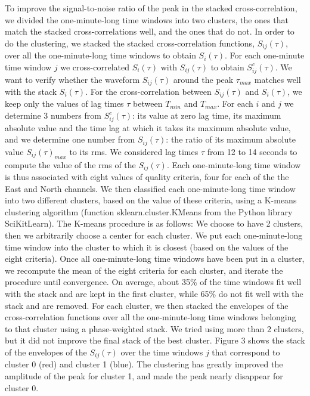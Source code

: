 \documentclass[draft]{agujournal2019}
\begin{document}
To improve the signal-to-noise ratio of the peak in the stacked cross-correlation, we divided the one-minute-long time windows into two clusters, the ones that match the stacked cross-correlations well, and the ones that do not. In order to do the clustering, we stacked the stacked cross-correlation functions, $S_{i j} (\tau)$, over all the one-minute-long time windows to obtain $S_i (\tau)$. For each one-minute time window $j$ we cross-correlated $S_i (\tau)$ with $S_{i j} (\tau)$ to obtain $S^c_{i j} (\tau)$. We want to verify whether the waveform $S_{i j} (\tau)$ around the peak $\tau_{max}$ matches well with the stack $S_i (\tau)$. For the cross-correlation between $S_{i j} (\tau)$ and $S_i (\tau)$, we keep only the values of lag times $\tau$ between $T_{min}$ and $T_{max}$. For each $i$ and $j$ we determine 3 numbers from $S^c_{i j} (\tau)$: its value at zero lag time, its maximum absolute value and the time lag at which it takes its maximum absolute value, and we determine one number from $S_{i j} (\tau)$: the ratio of its maximum absolute value $S_{i j} (\tau) _{max}$ to its rms. We considered lag times $\tau$ from 12 to 14 seconds to compute the value of the rms of the $S_{i j} (\tau)$. Each one-minute-long time window is thus associated with eight values of quality criteria, four for each of the the East and North channels. We then classified each one-minute-long time window into two different clusters, based on the value of these criteria, using a K-means clustering algorithm (function sklearn.cluster.KMeans from the Python library SciKitLearn). The K-means procedure is as follows: We choose to have 2 clusters, then we arbitrarily choose a center for each cluster. We put each one-minute-long time window into the cluster to which it is closest (based on the values of the eight criteria). Once all one-minute-long time windows have been put in a cluster, we recompute the mean of the eight criteria for each cluster, and iterate the procedure until convergence. On average, about 35\% of the time windows fit well with the stack and are kept in the first cluster, while 65\% do not fit well with the stack and are removed. For each cluster, we then stacked the envelopes of the cross-correlation functions over all the one-minute-long time windows belonging to that cluster using a phase-weighted stack. We tried using more than 2 clusters, but it did not improve the final stack of the best cluster. Figure 3 shows the stack of the envelopes of the $S_{i j} (\tau)$ over the time windows $j$ that correspond to cluster 0 (red) and cluster 1 (blue).  The clustering has greatly improved the amplitude of the peak for cluster 1, and made the peak nearly disappear for cluster 0. \\
\end{document}
